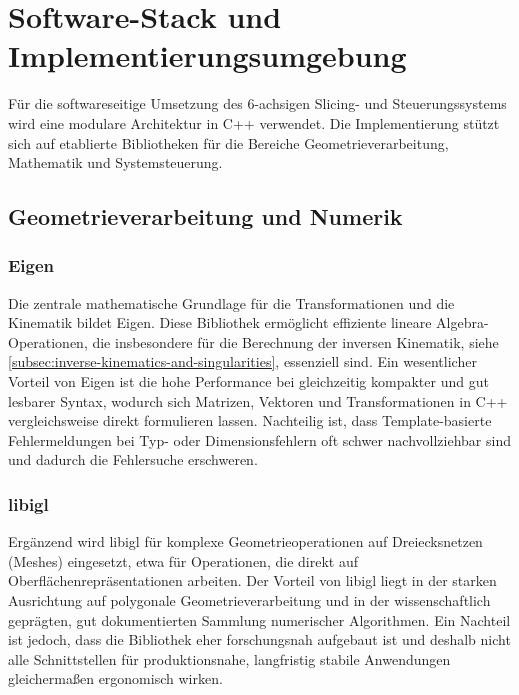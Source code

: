     \section{Software-Stack und Implementierungsumgebung}\label{sec:software-stack}
        Für die softwareseitige Umsetzung des 6-achsigen Slicing- und Steuerungssystems wird eine modulare Architektur in C++ verwendet.
        Die Implementierung stützt sich auf etablierte Bibliotheken für die Bereiche Geometrieverarbeitung, Mathematik und Systemsteuerung.

        \subsection{Geometrieverarbeitung und Numerik}

        \subsubsection{Eigen}
        Die zentrale mathematische Grundlage für die Transformationen und die Kinematik bildet Eigen.
        Diese Bibliothek ermöglicht effiziente lineare Algebra-Operationen,
        die insbesondere für die Berechnung der inversen Kinematik, siehe \cref{subsec:inverse-kinematics-and-singularities}, essenziell sind.
        Ein wesentlicher Vorteil von Eigen ist die hohe Performance bei gleichzeitig kompakter und gut lesbarer Syntax,
        wodurch sich Matrizen, Vektoren und Transformationen in C++ vergleichsweise direkt formulieren lassen.
        Nachteilig ist, dass Template-basierte Fehlermeldungen bei Typ- oder Dimensionsfehlern oft schwer nachvollziehbar sind
        und dadurch die Fehlersuche erschweren.

        \subsubsection{libigl}
        Ergänzend wird libigl für komplexe Geometrieoperationen auf Dreiecksnetzen (Meshes) eingesetzt,
        etwa für Operationen, die direkt auf Oberflächenrepräsentationen arbeiten.
        Der Vorteil von libigl liegt in der starken Ausrichtung auf polygonale Geometrieverarbeitung und in der wissenschaftlich geprägten,
        gut dokumentierten Sammlung numerischer Algorithmen.
        Ein Nachteil ist jedoch, dass die Bibliothek eher forschungsnah aufgebaut ist und deshalb nicht alle Schnittstellen für produktionsnahe,
        langfristig stabile Anwendungen gleichermaßen ergonomisch wirken.

